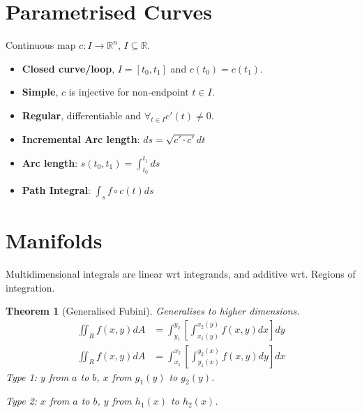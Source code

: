 \documentclass[a4paper]{article}
\newcommand{\RR}{\mathbb{R}}
\newtheorem*{theorem*}{Theorem}
\begin{document}
\begin{multicols}{2}
	\section*{Parametrised Curves}
	Continuous map $c:I\to\RR^n$, $I\subseteq\RR$.
	\begin{itemize}
		\item \textbf{Closed curve/loop}, $I=[t_0,t_1]$ and $c(t_0)=c(t_1)$.
		\item \textbf{Simple}, $c$ is injective for non-endpoint $t\in I$.
		\item \textbf{Regular}, differentiable and $\forall_{t\in I}c'(t)\neq 0$.
		\item \textbf{Incremental Arc length}: $ds=\sqrt{c'\cdot c'}dt$
		\item \textbf{Arc length}: $s(t_0,t_1)=\int_{t_0}^{t_1}ds$
		\item \textbf{Path Integral}: $\int_s f \circ c(t)ds $

	\end{itemize}
	\section*{Manifolds}
	Multidimensional integrals are linear wrt integrands, and additive wrt. Regions of integration.
	\begin{theorem*}[Generalised Fubini] Generalises to higher dimensions.
		\begin{align*}
			\iint_Rf(x,y)dA & =\int_{y_1}^{y_2}\left[ \int_{x_1(y)}^{x_2(y)}f(x,y)dx \right]dy \\
			\iint_Rf(x,y)dA & =\int_{x_1}^{x_2}\left[ \int_{y_1(x)}^{y_2(x)}f(x,y)dy \right]dx
		\end{align*}
		Type 1: $y$ from $a$  to $b$, $x$ from $g_1(y)$ to $g_2(y)$.

		Type 2: $x$ from $a$  to $b$, $y$ from $h_1(x)$ to $h_2(x)$.
	\end{theorem*}



\end{multicols}
\end{document}
